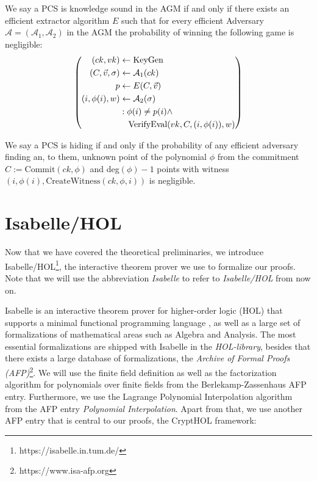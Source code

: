 \begin{definition}
    We say a PCS is knowledge sound in the AGM if and only if there exists an efficient extractor algorithm $E$ such that for every efficient Adversary $\mathcal{A}=(\mathcal{A}_1, \mathcal{A}_2)$ in the AGM the probability of winning the following game is negligible: 
    \begin{equation*}
        \left(
            \begin{aligned}
                (ck,vk) & \leftarrow \text{KeyGen} \\
                (C,\vec{v}, \sigma) & \leftarrow \mathcal{A}_1(ck)\\
                p & \leftarrow E(C,\vec{v}) \\
                (i, \phi(i), w) &\leftarrow \mathcal{A}_2(\sigma)\\
                & : \phi(i) \ne p(i) \land \\
                & \hspace{3.5mm} \text{VerifyEval}(vk, C,(i,\phi(i)),w)
            \end{aligned}
        \right)
    \end{equation*}
    \parencite{plonk}
\end{definition}

\begin{definition}[hiding]
    We say a PCS is hiding if and only if the probability of any efficient adversary finding an, to them, unknown point of the polynomial $\phi$ from the commitment $C:=\text{Commit}(ck,\phi)$ and deg$(\phi)-1$ points with witness  $(i,\phi(i),\text{CreateWitness}(ck, \phi, i))$ is negligible.
    \parencite{KZG}
\end{definition}

\section{Isabelle/HOL}
Now that we have covered the theoretical preliminaries, we introduce Isabelle/HOL\footnote{https://isabelle.in.tum.de/}, the interactive theorem prover we use to formalize our proofs. 
Note that we will use the abbreviation \textit{Isabelle} to refer to \textit{Isabelle/HOL} from now on. 

Isabelle is an interactive theorem prover for higher-order logic (HOL) that supports a minimal functional programming language \parencite{isabelle_manual}, as well as a large set of formalizations of mathematical areas such as Algebra and Analysis. The most essential formalizations are shipped with Isabelle in the \textit{HOL-library}, besides that there exists a large database of formalizations, the \textit{Archive of Formal Proofs (AFP)}\footnote{https://www.isa-afp.org}. We will use the finite field definition as well as the factorization algorithm for polynomials over finite fields from the Berlekamp-Zassenhaus\parencite{Berlekamp_Zassenhaus-AFP} AFP entry. Furthermore, we use the Lagrange Polynomial Interpolation algorithm from the AFP entry \textit{Polynomial Interpolation}\parencite{Polynomial_Interpolation-AFP}.
Apart from that, we use another AFP entry that is central to our proofs, the CryptHOL framework\parencite{CryptHOL-AFP}:

